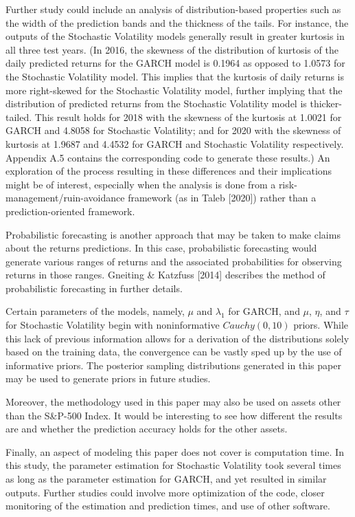 \documentclass[12pt,letterpaper,reqno,fleqn]{article}
\begin{document}
Further study could include an analysis of distribution-based properties such as the width of the prediction bands and the thickness of the tails. For instance, the outputs of the Stochastic Volatility models generally result in greater kurtosis in all three test years. (In 2016, the skewness of the distribution of kurtosis of the daily predicted returns for the GARCH model is 0.1964 as opposed to 1.0573 for the Stochastic Volatility model. This implies that the kurtosis of daily returns is more right-skewed for the Stochastic Volatility model, further implying that the distribution of predicted returns from the Stochastic Volatility model is thicker-tailed. This result holds for 2018 with the skewness of the kurtosis at 1.0021 for GARCH and 4.8058 for Stochastic Volatility; and for 2020 with the skewness of kurtosis at 1.9687 and 4.4532 for GARCH and Stochastic Volatility respectively. Appendix A.5 contains the corresponding code to generate these results.) An exploration of  the process resulting in these differences and their implications might be of interest, especially when the analysis is done from a risk-management/ruin-avoidance framework (as in Taleb [2020]) rather than a prediction-oriented framework.

Probabilistic forecasting is another approach that may be taken to make claims about the returns predictions. In this case, probabilistic forecasting would generate various ranges of returns and the associated probabilities for observing returns in those ranges. Gneiting \& Katzfuss [2014] describes the method of probabilistic forecasting in further details.

Certain parameters of the models, namely, $\mu$ and $\lambda_1$ for GARCH, and $\mu$, $\eta$, and $\tau$ for Stochastic Volatility begin with noninformative $Cauchy(0,10)$ priors. While this lack of previous information allows for a derivation of the distributions solely based on the training data, the convergence can be vastly sped up by the use of informative priors. The posterior sampling distributions generated in this paper may be used to generate priors in future studies.

Moreover, the methodology used in this paper may also be used on assets other than the S\&P-500 Index. It would be interesting to see how different the results are and whether the prediction accuracy holds for the other assets.

Finally, an aspect of modeling this paper does not cover is computation time. In this study, the parameter estimation for Stochastic Volatility took several times as long as the parameter estimation for GARCH, and yet resulted in similar outputs. Further studies could involve more optimization of the code, closer monitoring of the estimation and prediction times, and use of other software.   
\end{document}
